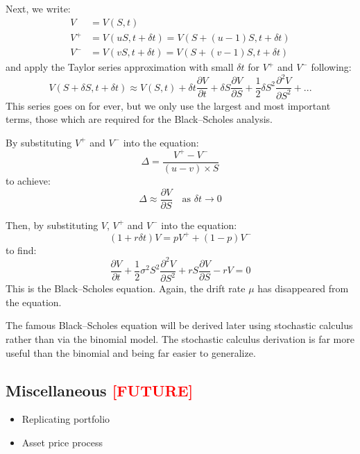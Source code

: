 Next, we write:
\begin{align}
    V   &= V(S , t)                                          \\
    V^+ &= V(uS, t + \delta t) = V(S + (u-1)S, t + \delta t) \\
    V^- &= V(vS, t + \delta t) = V(S + (v-1)S, t + \delta t)   
\end{align}
and apply the Taylor series approximation with small $\delta t$ for $V^+$ and $V^-$ following:
\begin{equation}
    V(S + \delta S, t + \delta t) \approx V(S,t) + \delta t \frac{\partial V}{\partial t} + \delta S \frac{\partial V}{\partial S} + \frac{1}{2} \delta S^2 \frac{\partial^2 V}{\partial S^2} + ...
\end{equation}
This series goes on for ever, but we only use the largest and most important terms, those which are required for the Black–Scholes analysis.

By substituting $V^+$ and $V^-$ into the equation:
\begin{equation*}
    \Delta = \frac{V^+ - V^-}{(u-v) \times S}
\end{equation*}
to achieve:
\begin{equation}
    \Delta \approx \frac{\partial V}{\partial S} \quad \text{as } \delta t \rightarrow 0
\end{equation}

Then, by substituting $V$, $V^+$ and $V^-$ into the equation:
\begin{equation*}
    \left( 1 + r \delta t \right) V = p V^+ + (1-p)V^-
\end{equation*}
to find:
\begin{equation}
    \frac{\partial V}{\partial t} + \frac{1}{2} \sigma^2 S^2 \frac{\partial^2 V}{\partial S^2} + rS \frac{\partial V}{\partial S} - rV = 0
\end{equation}
This is the Black–Scholes equation. Again, the drift rate $\mu$ has disappeared from the equation. 

The famous Black–Scholes equation will be derived later using stochastic calculus rather than via the binomial model. The stochastic calculus derivation is far more useful than the binomial and being far easier to generalize.



\subsection{Miscellaneous \textcolor{red}{[FUTURE]}}
\begin{itemize}
    \setlength\itemsep{0em}
    \item Replicating portfolio
    \item Asset price process
\end{itemize}



